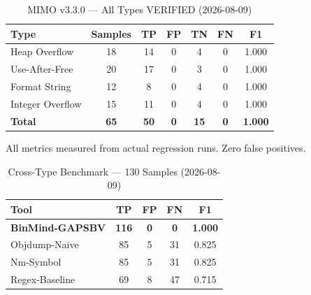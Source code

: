 \begin{table}[htbp]
  \centering
  \caption{MIMO v3.3.0 — All Types VERIFIED (2026-08-09)}
  \label{tab:mimo-v330-verified}
  \begin{tabular}{lcccccc}
    \toprule
    \textbf{Type} & \textbf{Samples} & \textbf{TP} & \textbf{FP} & \textbf{TN} & \textbf{FN} & \textbf{F1} \\
    \midrule
    Heap Overflow & 18 & 14 & 0 & 4 & 0 & 1.000 \\
    Use-After-Free & 20 & 17 & 0 & 3 & 0 & 1.000 \\
    Format String & 12 & 8 & 0 & 4 & 0 & 1.000 \\
    Integer Overflow & 15 & 11 & 0 & 4 & 0 & 1.000 \\
    \midrule
    \textbf{Total} & \textbf{65} & \textbf{50} & \textbf{0} & \textbf{15} & \textbf{0} & \textbf{1.000} \\
    \bottomrule
  \end{tabular}
  \vspace{4pt}
  \footnotesize{All metrics measured from actual regression runs. Zero false positives.}
\end{table}

\begin{table}[htbp]
  \centering
  \caption{Cross-Type Benchmark — 130 Samples (2026-08-09)}
  \label{tab:cross-type-130}
  \begin{tabular}{lcccc}
    \toprule
    \textbf{Tool} & \textbf{TP} & \textbf{FP} & \textbf{FN} & \textbf{F1} \\
    \midrule
    \rowcolor{blue!10}\textbf{BinMind-GAPSBV} & \textbf{116} & \textbf{0} & \textbf{0} & \textbf{1.000} \\
    Objdump-Naive & 85 & 5 & 31 & 0.825 \\
    Nm-Symbol & 85 & 5 & 31 & 0.825 \\
    Regex-Baseline & 69 & 8 & 47 & 0.715 \\
    \bottomrule
  \end{tabular}
\end{table}